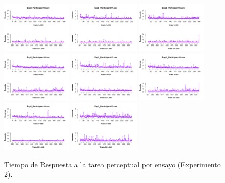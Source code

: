 \begin{figure}[th]
\includegraphics[width=0.30\textwidth]{Figures/RT1_Exp2_P13} \includegraphics[width=0.30\textwidth]{Figures/RT1_Exp2_P14} \includegraphics[width=0.30\textwidth]{Figures/RT1_Exp2_P15}
\includegraphics[width=0.30\textwidth]{Figures/RT1_Exp2_P16} \includegraphics[width=0.30\textwidth]{Figures/RT1_Exp2_P17} \includegraphics[width=0.30\textwidth]{Figures/RT1_Exp2_P18}
\includegraphics[width=0.30\textwidth]{Figures/RT1_Exp2_P19} \includegraphics[width=0.30\textwidth]{Figures/RT1_Exp2_P20} 
\caption[TR1_Exp2]{Tiempo de Respuesta a la tarea perceptual por ensayo (Experimento 2).}
\label{fig:RT1_E2}
\end{figure}


